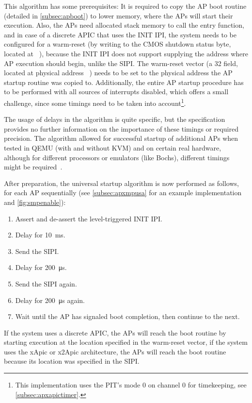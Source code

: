 This algorithm has some prerequisites: It is required to copy the AP boot routine (detailed in \autoref{subsec:apboot}) to lower memory, where the APs will start their execution.
Also, the APs need allocated stack memory to call the entry function, and in case of a discrete APIC that uses the INIT IPI, the system needs to be configured for a warm-reset (by writing  to the CMOS shutdown status byte, located at ~\autocite[sec.~B.4]{mpspec}), because the INIT IPI does not support supplying the address where AP execution should begin, unlike the SIPI\@.
The warm-reset vector (a \SI{32}{\bit} field, located at physical address ~\autocite[sec.~B.4]{mpspec}) needs to be set to the physical address the AP startup routine was copied to.
Additionally, the entire AP startup procedure has to be performed with all sources of interrupts disabled, which offers a small challenge, since some timings need to be taken into account\footnote{
  This implementation uses the PIT's mode 0 on channel 0 for timekeeping, see \autoref{subsec:apxapictimer}.}.

The usage of delays in the algorithm is quite specific, but the specification provides no further information on the importance of these timings or required precision.
The algorithm allowed for successful startup of additional APs when tested in QEMU (with and without KVM) and on certain real hardware, although for different processors or emulators (like Bochs), different timings might be required~\autocite[lapic.c]{xv6}.

After preparation, the universal startup algorithm is now performed as follows, for each AP sequentially (see \autoref{subsec:apxmpusa} for an example implementation and \autoref{fig:smpenable}):

\begin{enumerate}
  \item Assert and de-assert the level-triggered INIT IPI\@.
  \item Delay for \SI{10}{\milli\second}.
  \item Send the SIPI\@.
  \item Delay for \SI{200}{\micro\second}.
  \item Send the SIPI again.
  \item Delay for \SI{200}{\micro\second} again.
  \item Wait until the AP has signaled boot completion, then continue to the next.
\end{enumerate}

If the system uses a discrete APIC, the APs will reach the boot routine by starting execution at the location specified in the warm-reset vector, if the system uses the xApic or x2Apic architecture, the APs will reach the boot routine because its location was specified in the SIPI\@.


